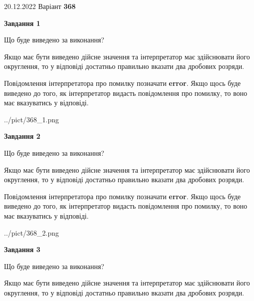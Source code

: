 \documentclass[12pt, ukrainian]{article}
\begin{document}
{20.12.2022 Варіант \No \textbf { 368 }\par}
{
\begin {Large}

{\begin {center}\textbf{Завдання 1}\end {center}}\par
Що буде виведено за виконання? \par

Якщо має бути виведено дійсне значення та інтерпретатор має здійснювати його округлення, 
то у відповіді достатньо правильно вказати два дробових розряди.

Повідомлення інтерпретатора про помилку позначати \textbf{error}.
Якщо щось буде виведено до того, як інтерпретатор видасть повідомлення про помилку, 
то воно має вказуватись у відповіді. \par

\begin{center}
	{../pict/368_1.png}
\end{center}
\newpage

{\begin {center}\textbf{Завдання 2}\end {center}}\par
Що буде виведено за виконання? \par

Якщо має бути виведено дійсне значення та інтерпретатор має здійснювати його округлення, 
то у відповіді достатньо правильно вказати два дробових розряди.

Повідомлення інтерпретатора про помилку позначати \textbf{error}.
Якщо щось буде виведено до того, як інтерпретатор видасть повідомлення про помилку, 
то воно має вказуватись у відповіді. \par

\begin{center}
	{../pict/368_2.png}
\end{center}
\newpage

{\begin {center}\textbf{Завдання 3}\end {center}}\par
Що буде виведено за виконання? \par

Якщо має бути виведено дійсне значення та інтерпретатор має здійснювати його округлення, 
то у відповіді достатньо правильно вказати два дробових розряди.


\end{Large}}
\end{document}
